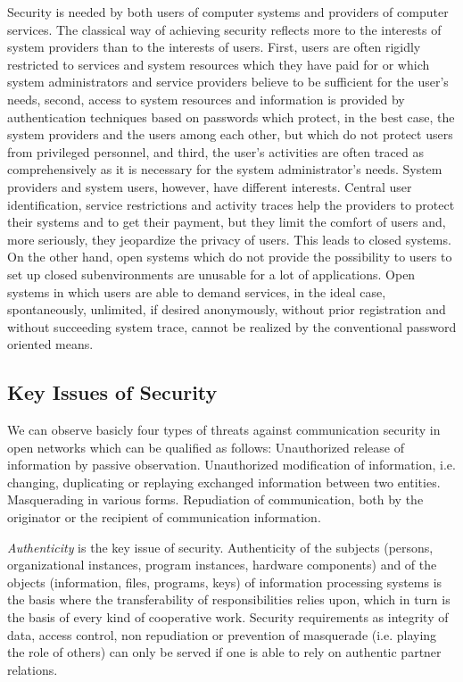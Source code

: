 Security is needed by both users of computer systems and providers of computer
services. The classical way of achieving security reflects more to the interests
of system providers than to the interests of users.
First, users are often rigidly restricted to services and system resources 
which they have paid for or which 
system administrators and service providers believe to be sufficient for the user's needs,
second, access to system resources and information is provided by authentication
techniques based on passwords which protect, in the best case, the system
providers and the users among each other, but which do not protect users from
privileged personnel, 
and third, the user's activities are often traced as comprehensively as it is necessary
for the system administrator's needs. System providers and system users, however,
have different interests. Central user identification, service restrictions and
activity traces help the providers to protect their systems and to get their payment,
but they limit the comfort of users and, more seriously, they jeopardize the privacy
of users. This leads to closed systems. On the other hand, open systems which do
not provide the possibility to users to set up closed subenvironments are unusable
for a lot of applications.
Open systems in which users are able to demand services, 
in the ideal case, spontaneously, unlimited, if desired anonymously, without
prior registration and without succeeding system trace, cannot be realized by 
the conventional password oriented means.

\subsection{Key Issues of Security}
We can observe basicly four types of threats against communication security
in open networks which can be qualified as follows:
\bi
\m Unauthorized release of information by passive observation.
\m Unauthorized modification of information, i.e. changing, duplicating
   or replaying exchanged information between two entities.
\m Masquerading in various forms.
\m Repudiation of communication, both by the originator or the
   recipient of communication information.
\ei

{\em Authenticity} is the key issue of security. Authenticity of the subjects (persons,
organizational instances, program instances, hardware components) 
and of the objects (information, files, programs,
keys) of information processing systems is the basis where the transferability
of responsibilities relies upon, which in turn is the basis of every kind
of cooperative work. Security requirements as integrity of data, access control,
non repudiation or prevention of masquerade (i.e. playing the role of others)
can only be served if one is able to rely on authentic partner relations.


